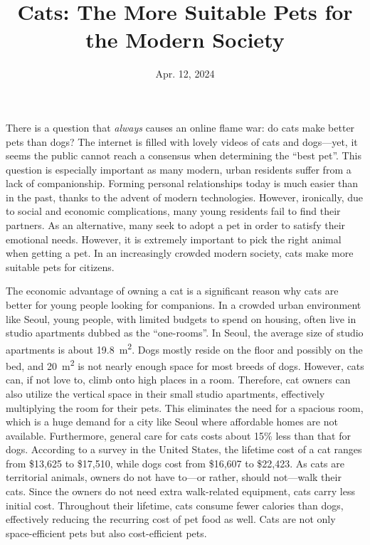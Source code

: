 \documentclass{tls1004}
\date{Apr. 12, 2024}
\title{Cats: The More Suitable Pets for the Modern Society}
\begin{document}
There is a question that \textit{always} causes an online flame war: do cats make better pets than dogs?
The internet is filled with lovely videos of cats and dogs---yet, it seems the public cannot reach a consensus when determining the ``best pet''.
This question is especially important as many modern, urban residents suffer from a lack of companionship.
Forming personal relationships today is much easier than in the past, thanks to the advent of modern technologies.
However, ironically, due to social and economic complications, many young residents fail to find their partners. 
As an alternative, many seek to adopt a pet in order to satisfy their emotional needs.
However, it is extremely important to pick the right animal when getting a pet.
In an increasingly crowded modern society, cats make more suitable pets for citizens.

The economic advantage of owning a cat is a significant reason why cats are better for young people looking for companions.
In a crowded urban environment like Seoul, young people, with limited budgets to spend on housing, often live in studio apartments dubbed as the ``one-rooms''.
In Seoul, the average size of studio apartments is about \SI{19.8}{\square\m}.
Dogs mostly reside on the floor and possibly on the bed, and \SI{20}{\square\m} is not nearly enough space for most breeds of dogs.
However, cats can, if not love to, climb onto high places in a room.
Therefore, cat owners can also utilize the vertical space in their small studio apartments, effectively multiplying the room for their pets.
This eliminates the need for a spacious room, which is a huge demand for a city like Seoul where affordable homes are not available.
Furthermore, general care for cats costs about 15\% less than that for dogs.
According to a survey in the United States, the lifetime cost of a cat ranges from \$13,625 to \$17,510, while dogs cost from \$16,607 to \$22,423.
As cats are territorial animals, owners do not have to---or rather, should not---walk their cats.
Since the owners do not need extra walk-related equipment, cats carry less initial cost.
Throughout their lifetime, cats consume fewer calories than dogs, effectively reducing the recurring cost of pet food as well.
Cats are not only space-efficient pets but also cost-efficient pets.
\end{document}
